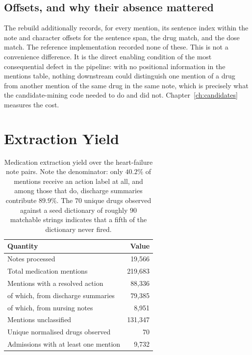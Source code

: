 \subsection{Offsets, and why their absence mattered}

The rebuild additionally records, for every mention, its sentence index within
the note and character offsets for the sentence span, the drug match, and the
dose match. The reference implementation recorded none of these. This is not a
convenience difference. It is the direct enabling condition of the most
consequential defect in the pipeline: with no positional information in the
mentions table, nothing downstream could distinguish one mention of a drug from
another mention of the same drug in the same note, which is precisely what the
candidate-mining code needed to do and did not.
Chapter~\ref{ch:candidates} measures the cost.

\section{Extraction Yield}
\label{sec:yield}

\begin{table}[t]
\centering
\small
\begin{tabular}{lr}
\toprule
\textbf{Quantity} & \textbf{Value} \\
\midrule
Notes processed & 19,566 \\
Total medication mentions & 219,683 \\
Mentions with a resolved action & 88,336 \\
\quad of which, from discharge summaries & 79,385 \\
\quad of which, from nursing notes & 8,951 \\
Mentions unclassified & 131,347 \\
Unique normalised drugs observed & 70 \\
Admissions with at least one mention & 9,732 \\
\bottomrule
\end{tabular}
\caption{Medication extraction yield over the heart-failure note pairs. Note the
denominator: only $40.2\%$ of mentions receive an action label at all, and among
those that do, discharge summaries contribute $89.9\%$. The $70$ unique drugs
observed against a seed dictionary of roughly $90$ matchable strings indicates
that a fifth of the dictionary never fired.}
\label{tab:yield}
\end{table}

